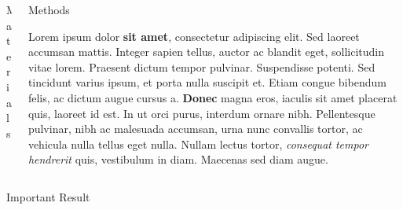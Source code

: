 \documentclass[final]{beamer}
\newlength{\onecolwid}
\newlength{\twocolwid}
\begin{document}
\begin{frame}[t]
\begin{columns}[t]
\begin{column}{\twocolwid}
\begin{columns}[t,totalwidth=\twocolwid]
\begin{column}{\onecolwid}
\begin{block}{Materials}
          \end{block}


        \end{column} %

        \begin{column}{\onecolwid}\vspace{-.6in} %


          \begin{block}{Methods}

            Lorem ipsum dolor \textbf{sit amet}, consectetur adipiscing elit. Sed laoreet accumsan mattis. Integer sapien tellus, auctor ac blandit eget, sollicitudin vitae lorem. Praesent dictum tempor pulvinar. Suspendisse potenti. Sed tincidunt varius ipsum, et porta nulla suscipit et. Etiam congue bibendum felis, ac dictum augue cursus a. \textbf{Donec} magna eros, iaculis sit amet placerat quis, laoreet id est. In ut orci purus, interdum ornare nibh. Pellentesque pulvinar, nibh ac malesuada accumsan, urna nunc convallis tortor, ac vehicula nulla tellus eget nulla. Nullam lectus tortor, \textit{consequat tempor hendrerit} quis, vestibulum in diam. Maecenas sed diam augue.

          \end{block}


        \end{column} %

      \end{columns} %


      \begin{alertblock}{Important Result}


\end{alertblock}
\end{column}
\end{columns}
\end{frame}
\end{document}
